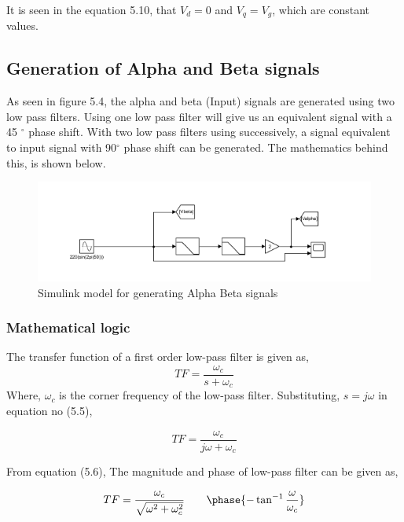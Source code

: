 \documentclass[a4paper,12pt]{iitmdiss}
\begin{document}
It is seen in the equation 5.10, that $V_d = 0$ and $V_q = V_g$, which are constant values. 



\subsection{Generation of Alpha and Beta signals}

As seen in figure 5.4, the alpha and beta (Input) signals are generated using two low pass filters. Using one low pass filter will give us an equivalent signal with a 45 $^\circ$ phase shift. With two low pass filters using successively, a signal equivalent to input signal with 90$^\circ$ phase shift can be generated. The mathematics behind this, is shown below.

\begin{figure}[hbt!]
    \centering
    \includegraphics[width=1.0\textwidth]{GenAlphaBeta.png}
    \caption{Simulink model for generating Alpha Beta signals}
\end{figure}


\subsubsection{Mathematical logic }

The transfer function of a first order low-pass filter is given as,
\begin{equation}
  TF = \frac{\omega_c}{s + \omega_c}
  \end{equation}
Where, $\omega_c$ is the corner frequency of the low-pass filter.
Substituting, $s = j\omega$  in equation no (5.5),

\begin{equation}
  TF = \frac{\omega_c}{j\omega + \omega_c}
  \end{equation}
  
  From equation (5.6), The magnitude and phase of low-pass filter can be given as,
  
  \begin{equation}
      TF = \frac{\omega_c}{\sqrt{\omega^2 + \omega_c^2}} \quad \quad \phase{-\tan^{-1}{\frac{\omega}{\omega_c}}}
  \end{equation}
\end{document}
